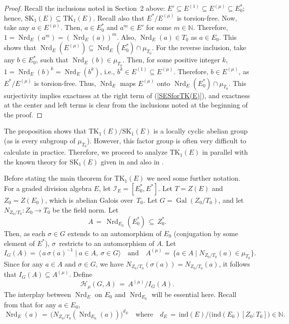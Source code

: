 \documentclass[11pt]{article}
\numberwithin{equation}{section}
\theoremstyle{plain}
\theoremstyle{remark}
\newcommand{\opn}{\operatorname}
\newcommand{\SK}{\opn{SK_1}}
\newcommand{\TK}{\opn{TK_1}}
\newcommand{\Emu}{E^{(\mu)}}
\newcommand{\Nrd}{\opn{Nrd}}
\newcommand{\nn}{\mathbb N}
\begin{document}
\begin{proof}
Recall the inclusions noted in Section~2 above: 
$E' \subseteq E^{(1)} \subseteq \Emu \subseteq E_0^*$; hence, ${\SK(E) \subseteq \TK(E)}$.  
Recall also that $E^*/\Emu$ is torsion-free.
Now, take any 
$a \in E^{(\mu)}$.  Then, $a\in E_0^*$ and $a^m \in E'$ for some $m\in \nn$. Therefore, 
$1 = \Nrd_E(a^m) = (\Nrd_E(a))^m$.
Also, $\Nrd_E(a) \in T_0$ as $a \in E_0$.  This shows that 
$\Nrd_E(E^{(\mu)}) \subseteq \Nrd_{E}(E_0^*)\cap \mu_{T_0}$.
For the reverse inclusion, take any $b \in E_0^*$, such that $\Nrd_E(b) \in \mu_{T_0}$.  Then, for some 
positive integer $k$,
$ 1= \Nrd_E(b)^k = \Nrd_E(b^k)$, i.e., $b^k \in E^{(1)} \subseteq E^{(\mu)}$.  Therefore, $b\in \Emu$, as
$E^*/\Emu$ is torsion-free.  
Thus, $\Nrd_E$ maps $\Emu$ onto  $\Nrd_{E}(E_0^*)\cap \mu_{T_0}$.  This surjectivity implies exactness at the
right term of (\ref{SESforTK(E)}), and exactness at the center and left terms is clear from the inclusions noted at the 
beginning of the proof. 
\end{proof}

The proposition shows that $\TK(E)/\SK(E)$ is a locally cyclic abelian group (as is every subgroup of $\mu_{T_0}$).  
However, this factor group is often very difficult to calculate in practice.  Therefore, we proceed to analyze 
$\TK(E)$ in parallel with the known theory for $\SK(E)$  given in \cite{hazrat-wadsworth-2011} and also in 
\cite[Ch.~11]{tignol-wadsworth-2015}.

Before stating the main theorem for $\TK(E)$ we need some further notation.  For a graded division algebra
$E$, let $\mathcal I_E=[E_0^*,E^*]$.  
Let $T = Z(E)$ and $Z_0 = Z(E_0)$, which is abelian Galois over~$T_0$.  Let $G =\opn{Gal}(Z_0/T_0)$, and let
$N_{Z_0/T_0}\colon Z_0 \to T_0$ be the field norm.  Let 
$$A \,=\,  \Nrd_{E_0}(E_0^*) \,\subseteq \,Z_0^*.
$$
  Then, as each
$\sigma\in G$ extends to an automorphism of $E_0$ (conjugation by some element of $E^*$), $\sigma$~restricts 
to an automorphism of $A$.  Let 
$$
        I_{G}(A)=\,\langle \,a\,\sigma(a)^{-1}\!\mid a\in A,\ \sigma\in G\rangle \quad \text{and} \quad
        A^{(\mu)}=\, \{a\in A\mid N_{Z_0/T_0}(a)\in\mu_{T_0}\}.
$$
Since for any $a\in A$ and $\sigma\in G$, we have $N_{Z_0/T_0}(\sigma(a)) = N_{Z_0/T_0}(a)$, it 
follows that ${I_G(A) \subseteq A^{(\mu)}}$.  Define  
$$
        \mathcal H_{\mu}(G,A)\,=\,A^{(\mu)}/I_{G}(A).
$$ 
The interplay between $\Nrd_E$ on $E_0$ and $\Nrd_{E_0}$ will be essential here.  Recall from 
\cite[Prop.~3.2(iv)]{hazrat-wadsworth-2011} that for any $a\in E_0$, 
\begin{equation}
 \label{E_0Nrdformula}
\Nrd_E(a) \, =  \,\big(N_{Z_0/T_0}(\Nrd_{E_0}(a))\big)^{d_E}\quad \text {where} \quad 
d_E \,=\, \text{ind}(E)\big/\big(\text{ind}(E_0)[Z_0:T_0]\big) \in \nn.
\end{equation}
\end{document}
